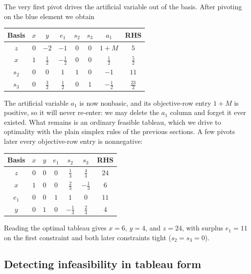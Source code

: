 \medskip
The very first pivot drives the artificial variable out of the basis. After pivoting on the blue element we obtain
\begin{center}
\renewcommand{\arraystretch}{1.3}\small\setlength{\tabcolsep}{4.5pt}
\begin{tabular}{c|cccccc|c}
\toprule
Basis & $x$ & $y$ & $e_1$ & $s_2$ & $s_3$ & $a_1$ & RHS\\
\midrule
$z$   & $0$ & $-2$ & $-1$ & $0$ & $0$ & $1+M$ & $5$\\
\midrule
$x$   & $1$ & $\tfrac12$ & $-\tfrac12$ & $0$ & $0$ & $\tfrac12$ & $\tfrac52$\\
$s_2$ & $0$ & $0$ & $1$ & $1$ & $0$ & $-1$ & $11$\\
$s_3$ & $0$ & $\tfrac32$ & $\tfrac12$ & $0$ & $1$ & $-\tfrac12$ & $\tfrac{23}{2}$\\
\bottomrule
\end{tabular}
\end{center}
The artificial variable $a_1$ is now nonbasic, and its objective-row entry $1+M$ is positive, so it will never re-enter: we may delete the $a_1$ column and forget it ever existed. What remains is an ordinary feasible tableau, which we drive to optimality with the plain simplex rules of the previous sections. A few pivots later every objective-row entry is nonnegative:
\begin{center}
\renewcommand{\arraystretch}{1.3}\small\setlength{\tabcolsep}{4.5pt}
\begin{tabular}{c|ccccc|c}
\toprule
Basis & $x$ & $y$ & $e_1$ & $s_2$ & $s_3$ & RHS\\
\midrule
\rowcolor{algopt!12}$z$ & $0$ & $0$ & $0$ & $\tfrac13$ & $\tfrac43$ & $24$\\
\midrule
$x$   & $1$ & $0$ & $0$ & $\tfrac23$  & $-\tfrac13$ & $6$\\
$e_1$ & $0$ & $0$ & $1$ & $1$         & $0$         & $11$\\
$y$   & $0$ & $1$ & $0$ & $-\tfrac13$ & $\tfrac23$  & $4$\\
\bottomrule
\end{tabular}
\end{center}
Reading the optimal tableau gives $x = 6$, $y = 4$, and $z = 24$, with surplus $e_1 = 11$ on the first constraint and both later constraints tight ($s_2 = s_3 = 0$).

\subsection{Detecting infeasibility in tableau form}

